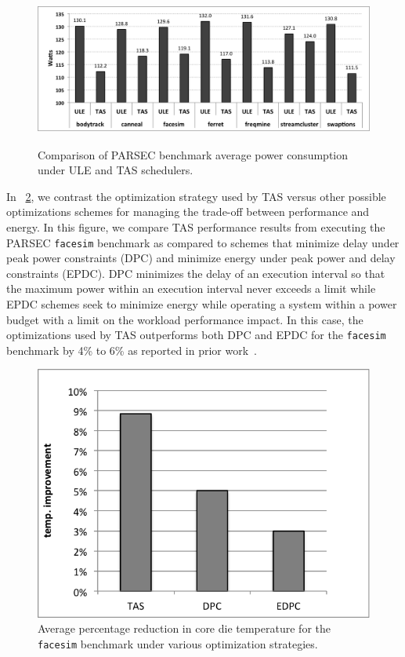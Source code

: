 \documentclass[times, 10pt,twocolumn]{IEEEtran}
\begin{document}
\begin{figure}[tbp]
  \includegraphics[width=1.0\linewidth,height=2in]{ParsecPowerConsumption.png}
  \caption{Comparison of PARSEC benchmark average power consumption under ULE and TAS schedulers.}
  \label{fig:pbenchmark}
\end{figure}
In \figurename~\ref{fig:tasvsedp}, we contrast the optimization strategy
used by TAS versus other possible optimizations schemes for managing the
trade-off between performance and energy.  In this figure, we compare
TAS performance results from executing the PARSEC
\texttt{facesim} benchmark as compared to schemes that minimize delay
under peak power constraints (DPC) and minimize energy under peak power and
delay constraints (EPDC). DPC minimizes the delay of an execution
interval so that the maximum power within an execution interval never
exceeds a limit while EPDC schemes seek to minimize energy while
operating a system within a power budget with a limit on the workload
performance impact. In this case, the optimizations used by TAS
outperforms both DPC and EPDC for the \texttt{facesim} 
benchmark by 4\% to 6\%  as reported in prior work~\cite{Cochran2011}. 

\begin{figure}[bpt]
  \centering
\includegraphics[scale=0.6]{graphics/tasvsedpc}
  \caption{Average percentage reduction in core die temperature for the
    \texttt{facesim} benchmark under various optimization strategies.}
  \label{fig:tasvsedp}
\end{figure}
\end{document}
